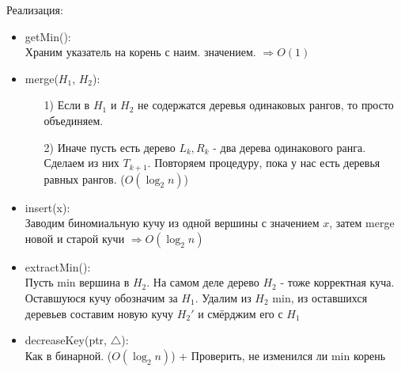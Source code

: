 Реализация:
\begin{itemize}
  \item getMin(): \\
    Храним указатель на корень с наим. значением. $ \Rightarrow O(1)$
  \item merge($H_1$, $H_2$): \\
    \begin{itemize}
      \item [1) ] Если в $H_1$ и $H_2$ не содержатся деревья одинаковых рангов, то просто объединяем.
      \item [2) ] Иначе пусть есть дерево $L_k, R_k$ - два дерева одинакового ранга. Сделаем из них $T_{k + 1}$. Повторяем процедуру, пока у нас есть деревья равных рангов. ($O(\log_2 n)$)
    \end{itemize}
  \item insert(x): \\
    Заводим биномиальную кучу из одной вершины с значением $x$, затем merge новой и старой кучи $\Rightarrow O(\log_2 n)$
  \item extractMin(): \\
    Пусть min вершина в $H_2$. На самом деле дерево $H_2$ - тоже корректная куча. Оставшуюся кучу обозначим за $H_1$. Удалим из $H_2$ min, из оставшихся деревьев составим новую кучу $H_2'$ и смёрджим его с $H_1$
  \item decreaseKey(ptr, $\triangle$): \\
    Как в бинарной. ($O(\log_2 n)$) + Проверить, не изменился ли min корень
\end{itemize}

